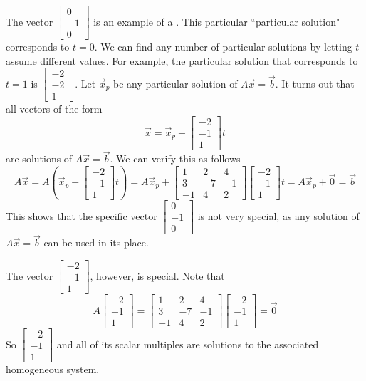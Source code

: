 \documentclass{ximera}
\begin{document}
\begin{initprob}
 The vector $\begin{bmatrix}0\\-1\\0\end{bmatrix}$ is an example of a .  This particular ``particular solution" corresponds to $t=0$.  We can find any number of particular solutions by letting $t$ assume different values.  For example, the particular solution that corresponds to $t=1$ is $\begin{bmatrix}-2\\-2\\1\end{bmatrix}$.  Let $\vec{x}_p$ be any particular solution of $A\vec{x}=\vec{b}$.  It turns out that all vectors of the form $$\vec{x}=\vec{x}_p+\begin{bmatrix}-2\\-1\\1\end{bmatrix}t$$ are solutions of $A\vec{x}=\vec{b}$.  We can verify this as follows
 $$A\vec{x}=A\left(\vec{x}_p+\begin{bmatrix}-2\\-1\\1\end{bmatrix}t\right)=A\vec{x}_p+\begin{bmatrix}1&2&4\\3&-7&-1\\-1&4&2\end{bmatrix}\begin{bmatrix}-2\\-1\\1\end{bmatrix}t=A\vec{x}_p+\vec{0}=\vec{b}$$
 This shows that the specific vector $\begin{bmatrix}0\\-1\\0\end{bmatrix}$ is not very special, as any solution of $A\vec{x}=\vec{b}$ can be used in its place.  
 
 The vector $\begin{bmatrix}-2\\-1\\1\end{bmatrix}$, however, is special.  
 Note that
 $$A\begin{bmatrix}-2\\-1\\1\end{bmatrix}=\begin{bmatrix}1&2&4\\3&-7&-1\\-1&4&2\end{bmatrix}\begin{bmatrix}-2\\-1\\1\end{bmatrix}=\vec{0}$$
 So $\begin{bmatrix}-2\\-1\\1\end{bmatrix}$ and all of its scalar multiples are solutions to the associated homogeneous system.  
\end{initprob}
\end{document}
